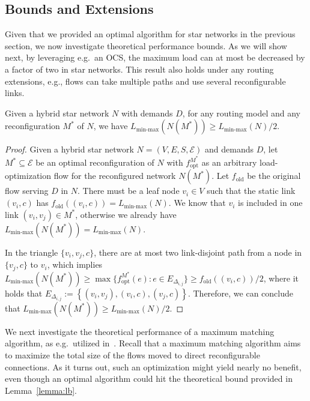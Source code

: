 \documentclass[sigconf]{acmart}
\newcommand{\E}{\mathcal{E}}  %
\begin{document}
\subsection{Bounds and Extensions}\label{subsec:lowerupper}
Given that we provided an optimal algorithm for star networks in the previous section, we now investigate theoretical performance bounds.
As we will show next, by leveraging e.g.\ an OCS, the maximum load can at most be decreased by a factor of two in star networks.
This result also holds under any routing extensions, e.g., flows can take multiple paths and use several reconfigurable links.
\begin{lemma}\label{lemma:lb}
Given a hybrid star network $N$ with demands $D$, for any routing model and any reconfiguration $M^*$ of $N$, we have $L_{\text{min-max}}\left(N(M^*) \right)\ge L_{\text{min-max}}\left( N\right)/2$.
\end{lemma}
\begin{proof}	
Given a hybrid star network $N=(V,E,S,\E)$ and demands $D$, let $M^{*}\subseteq \E$ be an optimal reconfiguration of $N$ with $f^{M^*}_{\text{opt}}$  as an arbitrary load-optimization flow for the reconfigured network $N\left( M^*\right)$.  Let $f_{\text{old}}$ be the original flow serving $D$ in $N$. There must be a leaf node $v_i\in V$ such that the static link $(v_i,c)$ has $f_{\text{old}}\left( (v_i,c)\right)= L_{\text{min-max}}\left( N\right)$. We know that $v_i$ is included in one link $(v_i,v_j)\in M^*$, otherwise we already have $L_{\text{min-max}}\left(N(M^*) \right)= L_{\text{min-max}}\left( N\right)$. 

In the triangle $\{v_i,v_j,c\}$, there are at most two link-disjoint path from a node in $\{v_j,c\}$ to $v_i$, which implies $L_{\text{min-max}}\left(N(M^*) \right)\ge \max\{f^{M^*}_{\text{opt}}(e): e\in E_{\Delta_{i,j}} \}\ge f_{\text{old}}\left( (v_i,c)\right)/2$, where it holds that $E_{\Delta_{i,j}}:=\left\{(v_i,v_j), (v_i,c), (v_j,c)\right\}$. Therefore,   we can conclude that  $L_{\text{min-max}}\left(N(M^*) \right)\ge L_{\text{min-max}}\left( N\right)/2$.
\end{proof}
We next investigate the theoretical performance of a maximum matching algorithm, as e.g.\ utilized in~\cite{cthrough}.
Recall that a maximum matching algorithm aims to maximize the total size of the flows moved to direct reconfigurable connections.
As it turns out, such an optimization might yield nearly no benefit, even though an optimal algorithm could hit the theoretical bound provided in Lemma~\ref{lemma:lb}.
\end{document}
